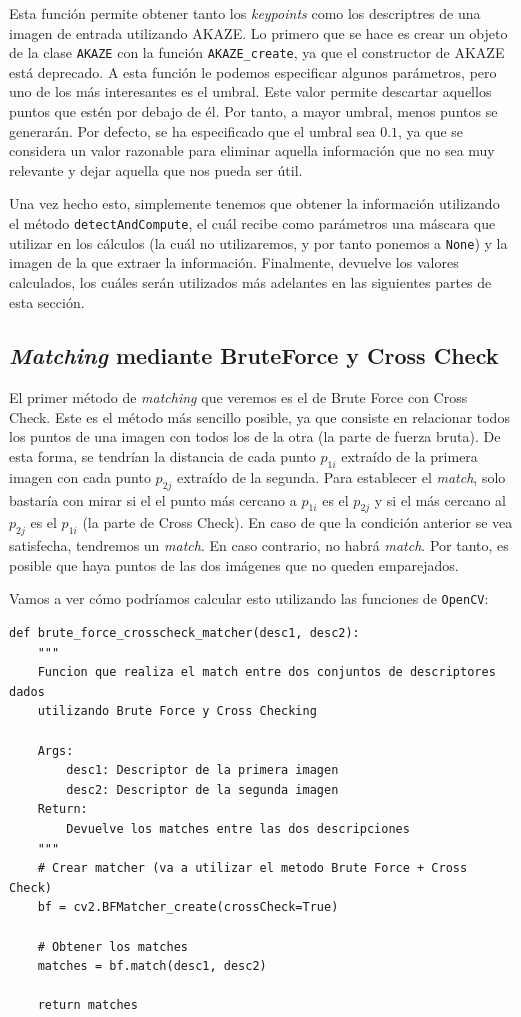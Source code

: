 \documentclass[11pt,a4paper]{article}
\begin{document}
Esta función permite obtener tanto los \textit{keypoints} como los descriptres
de una imagen de entrada utilizando AKAZE. Lo primero que se hace es crear
un objeto de la clase \texttt{AKAZE} con la función \texttt{AKAZE\_create}, ya que el constructor
de AKAZE está deprecado. A esta función le podemos especificar algunos parámetros, pero
uno de los más interesantes es el umbral. Este valor permite descartar aquellos puntos
que estén por debajo de él. Por tanto, a mayor umbral, menos puntos se generarán.
Por defecto, se ha especificado que el umbral sea $0.1$, ya que se considera un valor
razonable para eliminar aquella información que no sea muy relevante y dejar
aquella que nos pueda ser útil. 

Una vez hecho esto, simplemente tenemos que obtener
la información utilizando el método \texttt{detectAndCompute}, el cuál
recibe como parámetros una máscara que utilizar en los cálculos (la cuál
no utilizaremos, y por tanto ponemos a \texttt{None}) y la imagen de la que
extraer la información. Finalmente, devuelve los valores calculados, los cuáles
serán utilizados más adelantes en las siguientes partes de esta sección.

\subsection{\textit{Matching} mediante BruteForce y Cross Check}

El primer método de \textit{matching} que veremos es el de Brute Force con Cross Check.
Este es el método más sencillo posible, ya que consiste en relacionar todos los puntos de una
imagen con todos los de la otra (la parte de fuerza bruta). De esta forma, se tendrían la distancia de
cada punto $p_{1i}$ extraído de la primera imagen con cada punto $p_{2j}$ extraído de la
segunda. Para establecer el \textit{match}, solo bastaría con mirar si el el punto más cercano
a $p_{1i}$ es el $p_{2j}$ y si el más cercano al $p_{2j}$ es el $p_{1i}$ (la parte de Cross Check). En caso
de que la condición anterior se vea satisfecha, tendremos un \textit{match}. En caso contrario,
no habrá \textit{match}. Por tanto, es posible que haya puntos de las dos imágenes que no queden
emparejados.

Vamos a ver cómo podríamos calcular esto utilizando las funciones de \texttt{OpenCV}:

\begin{lstlisting}
def brute_force_crosscheck_matcher(desc1, desc2):
    """
    Funcion que realiza el match entre dos conjuntos de descriptores dados
    utilizando Brute Force y Cross Checking

    Args:
        desc1: Descriptor de la primera imagen
        desc2: Descriptor de la segunda imagen
    Return:
        Devuelve los matches entre las dos descripciones
    """
    # Crear matcher (va a utilizar el metodo Brute Force + Cross Check)
    bf = cv2.BFMatcher_create(crossCheck=True)

    # Obtener los matches
    matches = bf.match(desc1, desc2)

    return matches
\end{lstlisting}
\end{document}
